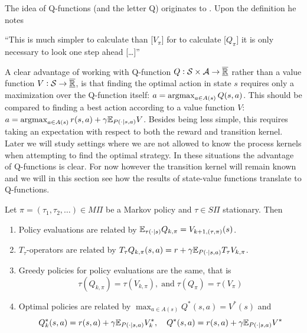 The idea of Q-functions (and the letter Q) originates to
. Upon the definition he notes
\begin{displayquote}
  ``This is much simpler to calculate than [$V_\pi$]
  for to calculate [$Q_\pi$] it is only necessary to look one
  step ahead [\ldots]''
\end{displayquote}
A clear advantage of working with Q-function
$Q:\mathcal{S}\times\mathcal{A} \to \overline{\underline{\mathbb{R}}}$ rather than a value function
$V:\mathcal{S}\to \overline{\underline{\mathbb{R}}}$,
is that finding the optimal action in state $s$
requires only a maximization over the Q-function itself:
$a = \operatorname*{argmax}_{a \in A(s)} Q(s,a)$.
This should be compared to finding a best action according to a value
function $V$:
$a = \operatorname*{argmax}_{a \in A(s)} r(s,a) + \gamma \mathbb{E}_{P(\cdot \mid s,a)} V$.
Besides being less simple,
this requires taking an expectation with respect to 
both the reward and transition kernel.
Later we will study settings where we are not allowed to know
the process kernels when attempting to find the optimal strategy.
In these situations the advantage of Q-functions is clear.
For now however the transition kernel will remain known and we
will in this section see how the results of state-value functions
translate to Q-functions.

\begin{prop}
  Let $\pi = (\tau_1, \tau_2, \dots) \in M\Pi$ be a Markov policy
  and $\tau \in S\Pi$ stationary. Then
  \leavevmode
  \begin{enumerate}
    \item Policy evaluations are related by
      $\mathbb{E}_{\tau(\cdot \mid s)} Q_{k, \pi} = V_{k+1, (\tau, \pi)}(s)$.
    \item $T_\tau$-operators are related by $T_\tau Q_{k, \pi}(s, a)
      = r + \gamma \mathbb{E}_{P(\cdot \mid s, a)} T_\tau V_{k, \pi}$.
    \item Greedy policies for policy evaluations are the same,
      that is
      \[ \tau(Q_{k, \pi}) = \tau(V_{k, \pi}), \; \mathrm{and} \;
      \tau(Q_\pi) = \tau(V_\pi) \]
    \item Optimal policies are related by
      $\max_{a \in A(s)} Q^*(s, a) = V^*(s)$ and
      \[ Q^*_k(s, a) = r(s, a) + \gamma \mathbb{E}_{P(\cdot \mid s, a)} V^*_k,
      \quad Q^*(s, a) = r(s, a) + \gamma \mathbb{E}_{P(\cdot \mid s, a)} V^* \]
    \end{enumerate}
  \label{prop:relQV}
\end{prop}

